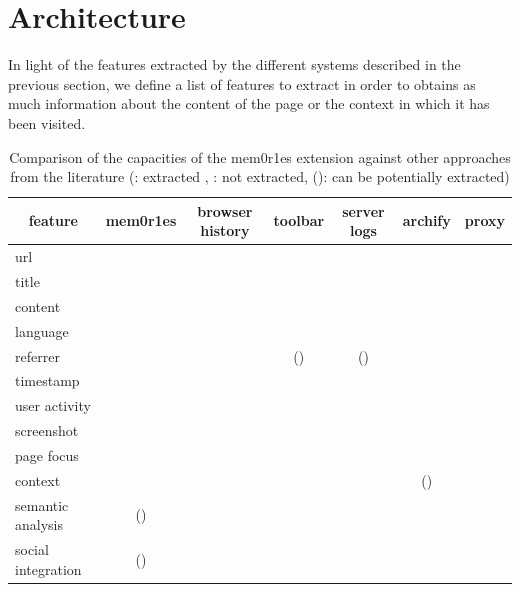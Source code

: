 \documentclass[10pt,a4paper]{article}
\newcommand{\cmark}{\ding{51}}
\newcommand{\xmark}{\ding{55}}
\begin{document}

\section{Architecture}
\label{sec:architecture}

In light of the features extracted by the different systems described in the previous section, we define a list of features to extract in order to obtains as much information about the content of the page or the context in which it has been visited.

{\renewcommand{\tabcolsep}{0.1cm}
\begin {table}[H]
\begin{center}
\begin{tabular}{|l|c|c|c|c|c|c|}
\hline
\multicolumn{1}{|c|}{\textbf{feature}}& \textbf{mem0r1es} & \textbf{browser history} & \textbf{toolbar} & \textbf{server logs} & \textbf{archify} & \textbf{proxy} \\
\hline
url & \cmark & \cmark & \cmark & \cmark & \cmark & \cmark\\
title & \cmark & \cmark & \xmark & \xmark & \cmark & \xmark\\
content & \cmark & \xmark & \xmark & \xmark & \cmark & \xmark\\
language & \cmark & \xmark & \cmark & \xmark & \xmark & \xmark\\
referrer & \cmark & \xmark & (\cmark) & (\cmark) & \cmark & \xmark\\
timestamp & \cmark & \cmark & \cmark & \cmark & \cmark & \cmark\\
user activity & \cmark & \xmark & \cmark & \xmark & \xmark & \cmark\\
screenshot & \cmark & \xmark & \xmark & \xmark & \cmark & \xmark\\
page focus & \cmark & \xmark & \xmark & \xmark & \xmark & \cmark\\
context & \cmark & \xmark & \xmark & \xmark & (\cmark) & \xmark\\
semantic analysis & (\cmark) & \xmark & \xmark & \xmark & \xmark & \cmark\\
social integration & (\cmark) & \xmark & \xmark & \xmark & \cmark & \xmark\\
\hline
\end{tabular}
\end{center}
	\caption{ Comparison of the capacities of the mem0r1es extension against other approaches from the literature (\cmark : extracted , \xmark: not extracted, (\cmark): can be potentially extracted)}
	\label{table:relatedProjects}
\end {table}
}
\end{document}
